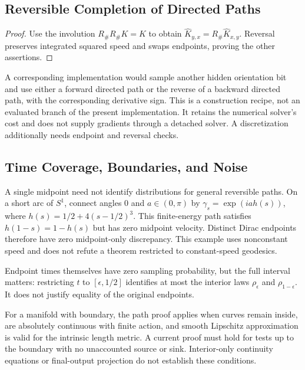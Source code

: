 \subsection{Reversible Completion of Directed Paths}
\begin{proof}
Use the involution $R_\#R_\#K=K$ to obtain $\widehat K_{y,x}=R_\#\widehat K_{x,y}$. Reversal preserves integrated squared speed and swaps endpoints, proving the other assertions.
\end{proof}
A corresponding implementation would sample another hidden orientation bit and use either a forward directed path or the reverse of a backward directed path, with the corresponding derivative sign. This is a construction recipe, not an evaluated branch of the present implementation. It retains the numerical solver's cost and does not supply gradients through a detached solver. A discretization additionally needs endpoint and reversal checks.

\subsection{Time Coverage, Boundaries, and Noise}
A single midpoint need not identify distributions for general reversible paths. On a short arc of $S^1$, connect angles $0$ and $a\in(0,\pi)$ by $\gamma_s=\exp(ia h(s))$, where $h(s)=1/2+4(s-1/2)^3$. This finite-energy path satisfies $h(1-s)=1-h(s)$ but has zero midpoint velocity. Distinct Dirac endpoints therefore have zero midpoint-only discrepancy. This example uses nonconstant speed and does not refute a theorem restricted to constant-speed geodesics.

Endpoint times themselves have zero sampling probability, but the full interval matters: restricting $t$ to $[\epsilon,1/2]$ identifies at most the interior laws $\rho_\epsilon$ and $\rho_{1-\epsilon}$. It does not justify equality of the original endpoints.

For a manifold with boundary, the path proof applies when curves remain inside, are absolutely continuous with finite action, and smooth Lipschitz approximation is valid for the intrinsic length metric. A current proof must hold for tests up to the boundary with no unaccounted source or sink. Interior-only continuity equations or final-output projection do not establish these conditions.


